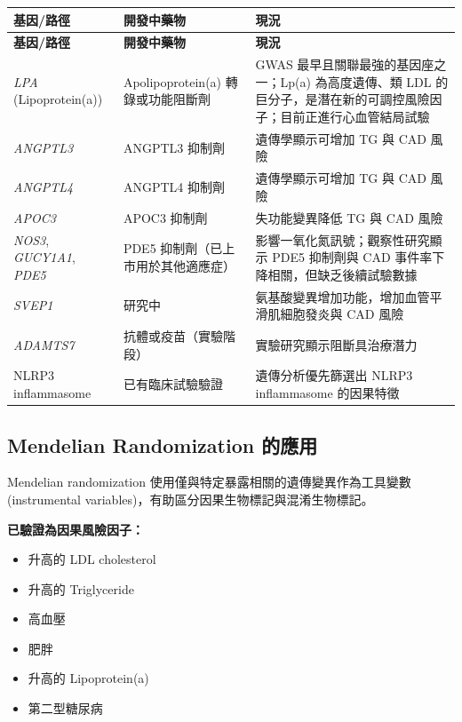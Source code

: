 \documentclass[12pt,a4paper]{article}
\begin{document}
\begin{longtable}{p{3cm}p{4cm}p{6.5cm}}
\toprule
\textbf{基因/路徑} & \textbf{開發中藥物} & \textbf{現況} \\
\midrule
\endfirsthead

\toprule
\textbf{基因/路徑} & \textbf{開發中藥物} & \textbf{現況} \\
\midrule
\endhead

\bottomrule
\endfoot

\textit{LPA} (Lipoprotein(a)) & Apolipoprotein(a) 轉錄或功能阻斷劑 & GWAS 最早且關聯最強的基因座之一；Lp(a) 為高度遺傳、類 LDL 的巨分子，是潛在新的可調控風險因子；目前正進行心血管結局試驗 \\
\midrule
\textit{ANGPTL3} & ANGPTL3 抑制劑 & 遺傳學顯示可增加 TG 與 CAD 風險 \\
\midrule
\textit{ANGPTL4} & ANGPTL4 抑制劑 & 遺傳學顯示可增加 TG 與 CAD 風險 \\
\midrule
\textit{APOC3} & APOC3 抑制劑 & 失功能變異降低 TG 與 CAD 風險 \\
\midrule
\textit{NOS3}, \textit{GUCY1A1}, \textit{PDE5} & PDE5 抑制劑（已上市用於其他適應症） & 影響一氧化氮訊號；觀察性研究顯示 PDE5 抑制劑與 CAD 事件率下降相關，但缺乏後續試驗數據 \\
\midrule
\textit{SVEP1} & 研究中 & 氨基酸變異增加功能，增加血管平滑肌細胞發炎與 CAD 風險 \\
\midrule
\textit{ADAMTS7} & 抗體或疫苗（實驗階段） & 實驗研究顯示阻斷具治療潛力 \\
\midrule
NLRP3 inflammasome & 已有臨床試驗驗證 & 遺傳分析優先篩選出 NLRP3 inflammasome 的因果特徵 \\
\bottomrule
\end{longtable}

\subsection{Mendelian Randomization 的應用}

Mendelian randomization 使用僅與特定暴露相關的遺傳變異作為工具變數 (instrumental variables)，有助區分因果生物標記與混淆生物標記。

\textbf{已驗證為因果風險因子：}
\begin{itemize}
    \item 升高的 LDL cholesterol
    \item 升高的 Triglyceride
    \item 高血壓
    \item 肥胖
    \item 升高的 Lipoprotein(a)
    \item 第二型糖尿病
\end{itemize}
\end{document}

